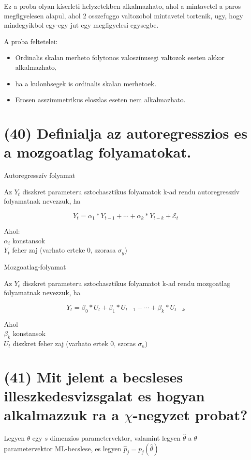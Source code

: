 \documentclass[12p]{article}
\begin{document}
Ez a proba olyan kíserleti helyzetekben alkalmazhato, ahol a mintavetel a paros megfigyelesen alapul, ahol 2 osszefuggo valtozobol mintavetel tortenik, ugy, hogy mindegyikbol egy-egy jut egy megfigyelesi egysegbe.

A proba feltetelei:
\begin{itemize}
	\item Ordinalis skalan merheto folytonos valoszínusegi valtozok eseten akkor alkalmazhato,
	\item ha a kulonbsegek is ordinalis skalan merhetoek.
	\item Erosen asszimmetrikus eloszlas eseten nem alkalmazhato.
\end{itemize}

\section{(40) Definialja az autoregresszios es a mozgoatlag folyamatokat.}

Autoregresszív folyamat

Az $Y_t$ diszkret parameteru sztochasztikus
folyamatok k-ad rendu autoregresszív
folyamatnak nevezzuk, ha

$$Y_t = \alpha_1 * Y_{t-1} + \cdots + \alpha_k * Y_{t-k} + \mathcal{E}_t$$

Ahol:\\
$\alpha_i$ konstansok\\
$Y_t$ feher zaj (varhato erteke 0, szorasa $\sigma_y$)

Mozgoatlag-folyamat

Az $Y_t$ diszkret parameteru sztochasztikus
folyamatot k-ad rendu mozgoatlag folyamatnak
nevezzuk, ha

$$Y_t = \beta_0 * U_t + \beta_1 * U_{t-1} + \cdots + \beta_k * U_{t-k}$$

Ahol\\
$\beta_k$ konstansok\\
$U_t$ diszkret feher zaj (varhato ertek 0, szoras $\sigma_u$)

\section{(41) Mit jelent a becsleses illeszkedesvizsgalat es hogyan alkalmazzuk ra a $\chi$-negyzet probat?}

Legyen $\theta$ egy $s$ dimenzios parametervektor, valamint legyen $\hat{\theta}$ a $\theta$ parametervektor ML-becslese, es legyen $\hat{p}_j = p_j(\hat{\theta})$
\end{document}
